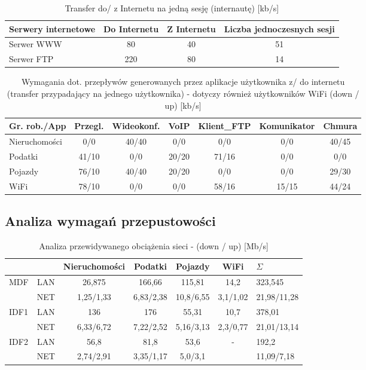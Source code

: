 \documentclass[12pt,a4paper]{article}
\begin{document}
	\begin{table}[H]
		\centering
		\begin{tabular}{l|c|c|c}
			Serwery internetowe&Do Internetu&Z Internetu&Liczba jednoczesnych sesji\\\hline
			Serwer WWW&80&40&51\\
			Serwer FTP&220&80&14\\
		\end{tabular}
		\caption{Transfer do/ z Internetu na jedną sesję (internautę) [kb/s]}
	\end{table}

	\begin{table}[H]
		\centering
		\begin{tabular}{l|c|c|c|c|c|c}
			Gr. rob./App&Przegl.&Wideokonf.&VoIP&Klient\_FTP&Komunikator&Chmura\\\hline
			Nieruchomości&0/0&40/40&0/0&0/0&0/0&40/45\\
			Podatki&41/10&0/0&20/20&71/16&0/0&0/0\\
			Pojazdy&76/10&40/40&20/20&0/0&0/0&29/30\\
			WiFi&78/10&0/0&0/0&58/16&15/15&44/24\\
		\end{tabular}
		\caption{Wymagania dot. przepływów generowanych przez aplikacje użytkownika z/ do internetu  (transfer przypadający na jednego użytkownika)  - dotyczy również użytkowników WiFi (down / up) [kb/s]}
	\end{table}

	\subsection{Analiza wymagań przepustowości}
	
	\begin{table}[H]
		\centering
		\begin{tabular}{l|c|c|c|c|c|l}
			&&Nieruchomości&Podatki&Pojazdy&WiFi&$\Sigma$\\\hline
			\multirow{2}{*}{MDF}&LAN&26,875&166,66&115,81&14,2&323,545\\
			&NET&1,25/1,33& 6,83/2,38&10,8/6,55&3,1/1,02&21,98/11,28\\\hline
			\multirow{2}{*}{IDF1}&LAN&136&176&55,31&10,7&378,01\\
			&NET&6,33/6,72&7,22/2,52&5,16/3,13&2,3/0,77&21,01/13,14\\\hline
			\multirow{2}{*}{IDF2}&LAN&56,8&81,8&53,6&\multirow{2}{*}{-}&192,2\\
			&NET&2,74/2,91&3,35/1,17&5,0/3,1&&11,09/7,18\\
		\end{tabular}
		\caption{Analiza przewidywanego obciążenia sieci - (down / up) [Mb/s]}
	\end{table}	
\end{document}
